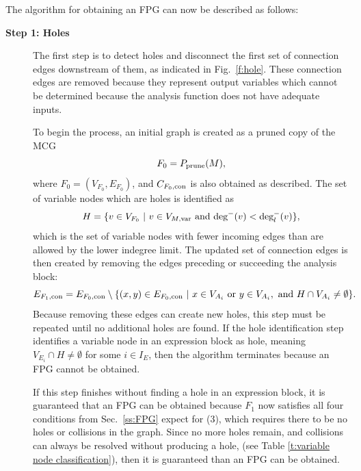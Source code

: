 \noindent The algorithm for obtaining an FPG can now be described as follows:
\begin{description}
    \item[\bf{Step 1: Holes}] 
        The first step is to detect holes and disconnect the first set of connection edges downstream of them, as indicated in Fig.~\ref{f:hole}. 
        These connection edges are removed because they represent output variables which cannot be determined because the analysis function does not have adequate inputs. 

        To begin the process, an initial graph is created as a pruned copy of the MCG
        \begin{equation}
        F_0 = P_\textrm{prune}(M),
        \end{equation}
        where $F_0 = (V_{F_0},E_{F_0})$, and $C_{F_0,\textrm{con}}$ is also obtained as described. 
        The set of variable nodes which are holes is identified as
        \begin{equation}
        H = \{v \in V_{F_0} \ | \  v \in V_{M,\textrm{var}} \textrm{ and } \textrm{deg}^-(v) < \textrm{deg}_l^-(v) \},
        \end{equation}
        which is the set of variable nodes with fewer incoming edges than are allowed by the lower indegree limit.
        The updated set of connection edges is then created by removing the edges preceding or succeeding the analysis block:
        \begin{equation}
        E_{F_1,\textrm{con}} = E_{F_0,\textrm{con}} \setminus \{(x,y) \in E_{F_0,\textrm{con}} \ | \  x \in V_{A_i} \textrm{ or } y \in V_{A_i}, \textrm{ and } H\cap V_{A_i} \neq \emptyset \}.
    \end{equation}
Because removing these edges can create new holes, this step must be repeated until no additional holes are found.
        If the hole identification step identifies a variable node in an expression block as hole, meaning $V_{E_i} \cap H \neq \emptyset$ for some $i \in I_E$, then the algorithm terminates because an FPG cannot be obtained. 

If this step finishes without finding a hole in an expression block, it is guaranteed that an FPG can be obtained because $F_1$ now satisfies all four conditions from Sec.~\ref{ss:FPG} expect for (3), which requires there to be no holes or collisions in the graph. Since no more holes remain, and collisions can always be resolved without producing a hole, (see Table \ref{t:variable node classification}), then it is guaranteed than an FPG can be obtained.


\end{description}
